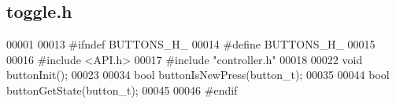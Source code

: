 \subsection{toggle.\+h}
\label{a00068_source}

\begin{DoxyCode}
00001 
00013 \textcolor{preprocessor}{#ifndef BUTTONS\_H\_}
00014 \textcolor{preprocessor}{#define BUTTONS\_H\_}
00015 
00016 \textcolor{preprocessor}{#include <API.h>}
00017 \textcolor{preprocessor}{#include "controller.h"}
00018 
00022 \textcolor{keywordtype}{void} buttonInit();
00023 
00034 \textcolor{keywordtype}{bool} buttonIsNewPress(button_t);
00035 
00044 \textcolor{keywordtype}{bool} buttonGetState(button_t);
00045 
00046 \textcolor{preprocessor}{#endif}
\end{DoxyCode}

